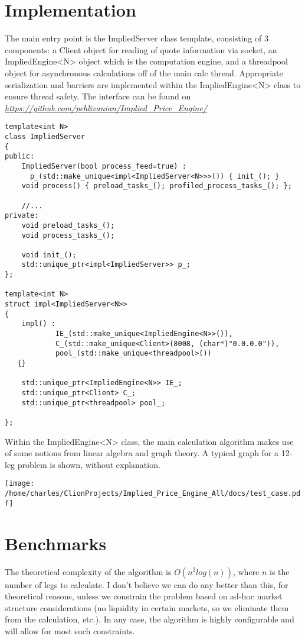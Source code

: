 \documentclass{article}
\begin{document}
\section*{Implementation}
The main entry point is the ImpliedServer class template, consisting of 3 components: a Client object for reading of quote information via socket, an ImpliedEngine<N> object which is the computation engine, and a threadpool object for asynchronous calculations off of the main calc thread. Appropriate serialization and barriers are implemented within the ImpliedEngine<N> class to ensure thread safety. The interface can be found on \href{https://github.com/pehlivanian/Implied_Price_Engine}{\it https://github.com/pehlivanian/Implied_Price_Engine/}

\begin{verbatim}
template<int N>
class ImpliedServer
{
public:
    ImpliedServer(bool process_feed=true) :
      p_(std::make_unique<impl<ImpliedServer<N>>>()) { init_(); }
    void process() { preload_tasks_(); profiled_process_tasks_(); };
 
    //...
private:
    void preload_tasks_();
    void process_tasks_();

    void init_();
    std::unique_ptr<impl<ImpliedServer>> p_;
};

template<int N>
struct impl<ImpliedServer<N>>
{
    impl() :
            IE_(std::make_unique<ImpliedEngine<N>>()),
            C_(std::make_unique<Client>(8008, (char*)"0.0.0.0")),
            pool_(std::make_unique<threadpool>()) 
   {}

    std::unique_ptr<ImpliedEngine<N>> IE_;
    std::unique_ptr<Client> C_;
    std::unique_ptr<threadpool> pool_;

};

\end{verbatim}

Within the ImpliedEngine<N> class, the main calculation algorithm makes use of some notions from linear algebra and graph theory. A typical graph for a 12-leg problem is shown, without explanation.

\texttt{[image: /home/charles/ClionProjects/Implied\_Price\_Engine\_All/docs/test\_case.pdf]}
\section*{Benchmarks}

The theoretical complexity of the algorithm is $O(n^2 log(n))$, where $n$ is the number of legs to calculate. I don't believe we can do any better than this, for theoretical reasons, unless we constrain the problem based on ad-hoc market structure considerations (no liquidity in certain markets, so we eliminate them from the calculation, etc.). In any case, the algorithm is highly configurable and will allow for most such constraints.
\end{document}
